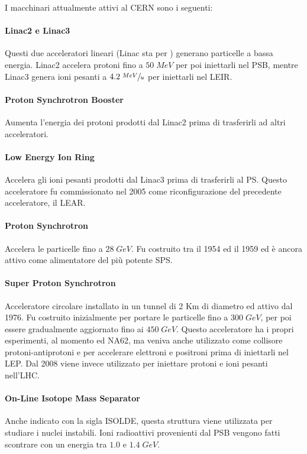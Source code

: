 		I macchinari attualmente attivi al \ac{CERN} sono i seguenti:
		
		\paragraph{Linac2 e Linac3}Questi due acceleratori lineari (\acs{Linac} sta per ) generano particelle a bassa energia. Linac2 accelera protoni fino a $50 \; MeV$ per poi iniettarli nel \ac{PSB}, mentre Linac3 genera ioni pesanti a $4.2 \; \sfrac{MeV}{u}$ per iniettarli nel \ac{LEIR}.
		
		\paragraph{Proton Synchrotron Booster}Aumenta l'energia dei protoni prodotti dal Linac2 prima di trasferirli ad altri acceleratori.
		
		\paragraph{Low Energy Ion Ring}Accelera gli ioni pesanti prodotti dal Linac3 prima di trasferirli al \ac{PS}. Questo acceleratore fu commissionato nel 2005 come riconfigurazione del precedente acceleratore, il \ac{LEAR}.
		
		\paragraph{Proton Synchrotron}Accelera le particelle fino a $28 \; GeV$. Fu costruito tra il 1954 ed il 1959 ed è ancora attivo come alimentatore del più potente \ac{SPS}.
		
		\paragraph{Super Proton Synchrotron}Acceleratore circolare installato in un tunnel di 2 Km di diametro ed attivo dal 1976. Fu costruito inizialmente per portare le particelle fino a $300 \; GeV$, per poi essere gradualmente aggiornato fino ai $450 \; GeV$. Questo acceleratore ha i propri esperimenti, al momento  ed NA62, ma veniva anche utilizzato come collisore protoni-antiprotoni e per accelerare elettroni e positroni prima di iniettarli nel \ac{LEP}. Dal 2008 viene invece utilizzato per iniettare protoni e ioni pesanti nell'\ac{LHC}.
		
		\paragraph{On-Line Isotope Mass Separator}Anche indicato con la sigla \acs{ISOLDE}, questa struttura viene utilizzata per studiare i nuclei instabili. Ioni radioattivi provenienti dal \ac{PSB} vengono fatti scontrare con un energia tra $1.0$ e $1.4 \; GeV$.
		

